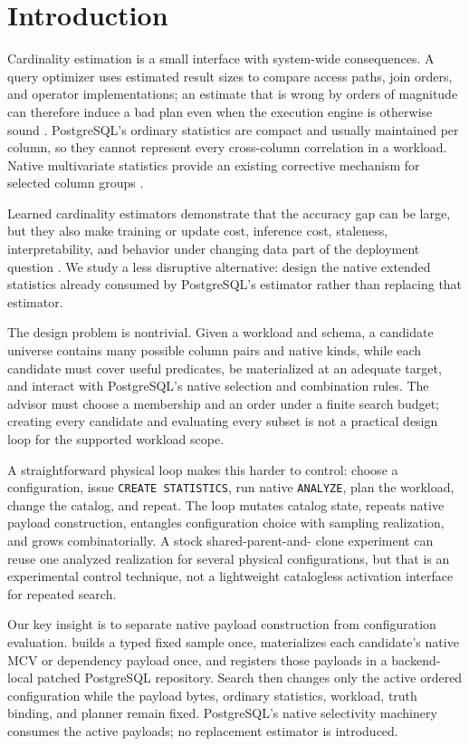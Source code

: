 \section{Introduction}

Cardinality estimation is a small interface with system-wide consequences. A
query optimizer uses estimated result sizes to compare access paths, join
orders, and operator implementations; an estimate that is wrong by orders of
magnitude can therefore induce a bad plan even when the execution engine is
otherwise sound \cite{Leis2015HowGood}. PostgreSQL's ordinary statistics are
compact and usually maintained per column, so they cannot represent every
cross-column correlation in a workload. Native multivariate statistics provide
an existing corrective mechanism for selected column groups \cite{PostgreSQL16Docs}.

Learned cardinality estimators demonstrate that the accuracy gap can be large,
but they also make training or update cost, inference cost, staleness,
interpretability, and behavior under changing data part of the deployment
question \cite{Wang2021AreWeReady}. We study a less disruptive alternative:
design the native extended statistics already consumed by PostgreSQL's
estimator rather than replacing that estimator.

The design problem is nontrivial. Given a workload and schema, a candidate
universe contains many possible column pairs and native kinds, while each
candidate must cover useful predicates, be materialized at an adequate target,
and interact with PostgreSQL's native selection and combination rules. The
advisor must choose a membership and an order under a finite search budget;
creating every candidate and evaluating every subset is not a practical design
loop for the supported workload scope.

A straightforward physical loop makes this harder to control: choose a
configuration, issue \texttt{CREATE STATISTICS}, run native \texttt{ANALYZE},
plan the workload, change the catalog, and repeat. The loop mutates catalog
state, repeats native payload construction, entangles configuration choice with
sampling realization, and grows combinatorially. A stock shared-parent-and-
clone experiment can reuse one analyzed realization for several physical
configurations, but that is an experimental control technique, not a lightweight
catalogless activation interface for repeated search.

Our key insight is to separate native payload construction from configuration
evaluation. \advisor builds a typed fixed sample once, materializes each
candidate's native MCV or dependency payload once, and registers those
payloads in a backend-local patched PostgreSQL repository. Search then changes
only the active ordered configuration while the payload bytes, ordinary
statistics, workload, truth binding, and planner remain fixed. PostgreSQL's
native selectivity machinery consumes the active payloads; no replacement
estimator is introduced.

